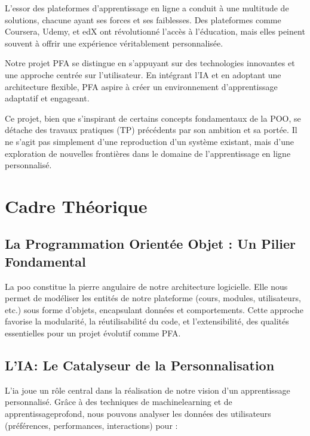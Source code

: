\vfill \dotfill

\begin{displayquote}
L'essor des plateformes d'apprentissage en ligne a conduit à une multitude de solutions, chacune ayant ses forces et ses faiblesses. Des plateformes comme Coursera, Udemy, et edX ont révolutionné l'accès à l'éducation, mais elles peinent souvent à offrir une expérience véritablement personnalisée.

Notre projet PFA se distingue en s'appuyant sur des technologies innovantes et une approche centrée sur l'utilisateur. En intégrant l'IA et en adoptant une architecture flexible, PFA aspire à créer un environnement d'apprentissage adaptatif et engageant.

Ce projet, bien que s'inspirant de certains concepts fondamentaux de la POO, se détache des travaux pratiques (TP) précédents par son ambition et sa portée. Il ne s'agit pas simplement d'une reproduction d'un système existant, mais d'une exploration de nouvelles frontières dans le domaine de l'apprentissage en ligne personnalisé.
\end{displayquote}

\section{Cadre Théorique}

\subsection{La Programmation Orientée Objet : Un Pilier Fondamental}

La \gls{poo} constitue la pierre angulaire de notre architecture logicielle. Elle nous permet de modéliser les entités de notre plateforme (cours, modules, utilisateurs, etc.) sous forme d'objets, encapsulant données et comportements. Cette approche favorise la modularité, la réutilisabilité du code, et l'extensibilité, des qualités essentielles pour un projet évolutif comme PFA.

\subsection{L'IA: Le Catalyseur de la Personnalisation}

L'\gls{ia} joue un rôle central dans la réalisation de notre vision d'un apprentissage personnalisé. Grâce à des techniques de \gls{machinelearning} et de \gls{apprentissageprofond}, nous pouvons analyser les données des utilisateurs (préférences, performances, interactions) pour :

